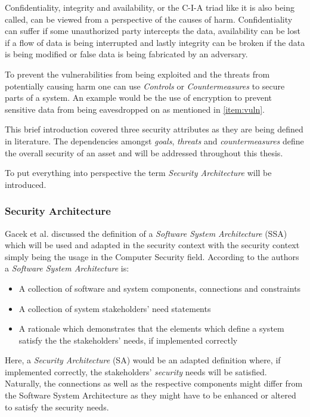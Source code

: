 Confidentiality, integrity and availability, or the C-I-A triad like it is also being called, can be viewed from a perspective of the causes of harm. Confidentiality can suffer if some unauthorized party intercepts the data, availability can be lost if a flow of data is being interrupted and lastly integrity can be broken if the data is being modified or false data is being fabricated by an adversary.

To prevent the vulnerabilities from being exploited and the threats from potentially causing harm one can use \textit{Controls} or \textit{Countermeasures} to secure parts of a system. An example would be the use of encryption to prevent sensitive data from being eavesdropped on as mentioned in \ref{item:vuln}. 

This brief introduction covered three security attributes as they are being defined in literature. The dependencies amongst \textit{goals}, \textit{threats} and \textit{countermeasures} define the overall security of an asset and will be addressed throughout this thesis. 

To put everything into perspective the term \textit{Security Architecture} will be introduced.

\subsubsection{Security Architecture}

Gacek et al. \cite{Gacek95onthe} discussed the definition of a \textit{Software System Architecture} (SSA) which will be used and adapted in the security context with the security context simply being the usage in the Computer Security field. According to the authors a \textit{Software System Architecture} is:

\begin{itemize}
\item A collection of software and system components, connections and constraints
\item A collection of system stakeholders' need statements
\item A rationale which demonstrates that the elements which define a system satisfy the the stakeholders' needs, if implemented correctly
\end{itemize}

Here, a \textit{Security Architecture} (SA) would be an adapted definition where, if implemented correctly, the stakeholders' \textit{security} needs will be satisfied. Naturally, the connections as well as the respective components might differ from the Software System Architecture as they might have to be enhanced or altered to satisfy the security needs. 

